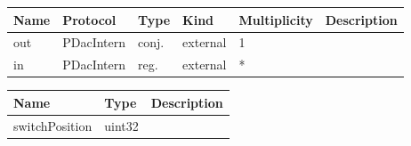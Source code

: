 

\begin{tabular}[ht]{|l|l|l|l|l|p{5cm}|}
\hline
\textbf{Name} & \textbf{Protocol} & \textbf{Type} & \textbf{Kind} & \textbf{Multiplicity} & \textbf{Description}\\
\hline
out & PDacIntern & conj. & external & 1 & \\
\hline
in & PDacIntern & reg. & external & * & \\
\hline
\end{tabular}


\begin{par}

\end{par}


\begin{tabular}[ht]{|l|l|p{8cm}|}
\hline
\textbf{Name} & \textbf{Type} & \textbf{Description}\\
\hline
switchPosition & uint32 & \\
\hline
\end{tabular}

